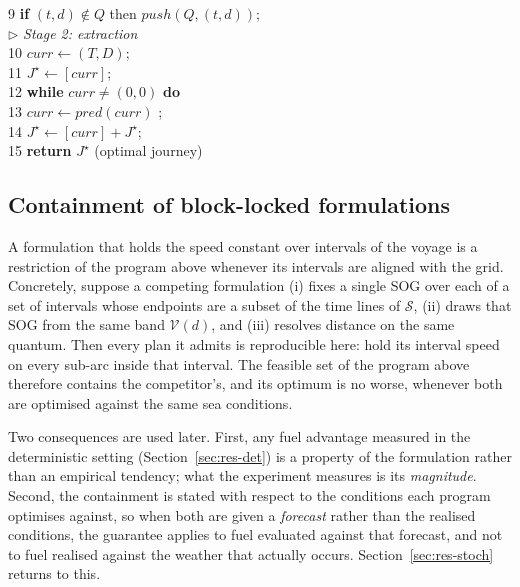 \documentclass[review,authoryear]{elsarticle}
\begin{document}
\begin{center}
{\begin{minipage}{0.95\textwidth}
\begin{tabbing}
{\scriptsize 9}\>\>\> \textbf{if} $(t,d) \notin Q$ then $push(Q,(t,d))$; \\
{\small$\triangleright$ \emph{Stage 2: extraction}}\\
{\scriptsize 10}\> $curr \leftarrow (T,D)$; \\
{\scriptsize 11}\> $J^{\star} \leftarrow [curr]$; \\
{\scriptsize 12}\> \textbf{while} $curr \ne (0,0)$ \textbf{do}\\
{\scriptsize 13}\>\> $curr \leftarrow pred(curr)$ ;\\
 {\scriptsize 14}\>\> $J^{\star} \leftarrow [curr] + J^{\star}$; \\
{\scriptsize 15}\> \textbf{return}  $J^{\star}$ (optimal journey) 
\end{tabbing}
\end{minipage}}
\end{center}





\subsection{Containment of block-locked formulations}
\label{sec:nesting}
A formulation that holds the speed constant over intervals of the voyage is a restriction of the
program above whenever its intervals are aligned with the grid. Concretely, suppose a competing
formulation (i) fixes a single SOG over each of a set of intervals whose endpoints are a subset of
the time lines of $\mathcal{S}$, (ii) draws that SOG from the same band $\mathcal{V}(d)$, and
(iii) resolves distance on the same quantum. Then every plan it admits is reproducible here: hold
its interval speed on every sub-arc inside that interval. The feasible set of the program above
therefore contains the competitor's, and its optimum is no worse, whenever both are optimised
against the same sea conditions.

Two consequences are used later. First, any fuel advantage measured in the deterministic setting
(Section~\ref{sec:res-det}) is a property of the formulation rather than an empirical tendency;
what the experiment measures is its \emph{magnitude}. Second, the containment is stated with respect
to the conditions each program optimises against, so when both are given a \emph{forecast} rather
than the realised conditions, the guarantee applies to fuel evaluated against that forecast, and not
to fuel realised against the weather that actually occurs. Section~\ref{sec:res-stoch} returns to this.
\end{document}
